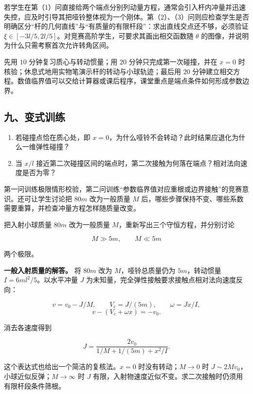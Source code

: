 \documentclass[12pt,a4paper,UTF8]{ctexart}
\newcommand{\tightlist}{\setlength{\itemsep}{0pt}\setlength{\parskip}{0pt}}
\begin{document}
若学生在第（1）问直接给两个端点分别列动量方程，通常会引入杆内冲量并迅速失控，应及时引导其把哑铃整体视为一个刚体。第（2）、（3）问则应检查学生是否明确区分``杆的几何直线''与``有质量的有限杆段''：求出直线交点还不够，必须验证
\(\xi\in[-3l/5,2l/5]\)。对竞赛高阶学生，可要求其画出相交函数随
\(\theta\) 的图像，并说明为什么只需考察首次允许转角区间。

先用 \(10\) 分钟复习质心与转动惯量；用 \(20\) 分钟只完成第一次碰撞，并在
\(x=0\) 时核验；休息式地用实物笔演示杆的转动与小球轨迹；最后用 \(20\)
分钟建立相交方程。数值临界值可以交给计算器或课后程序，课堂重点是端点条件如何形成参数边界。

\subsection{九、变式训练}\label{ux4e5dux53d8ux5f0fux8badux7ec3-1}

\begin{enumerate}
\def\labelenumi{\arabic{enumi}.}
\tightlist
\item
  若碰撞点恰在质心处，即
  \(x=0\)，为什么哑铃不会转动？此时结果应退化为什么一维弹性碰撞？
\item
  当 \(x/l\)
  接近第二次碰撞区间的端点时，第二次接触为何落在端点？相对法向速度是否为零？
\end{enumerate}

第一问训练极限情形校验，第二问训练``参数临界值对应重根或边界接触''的竞赛意识。还可让学生讨论把
\(80m\) 改为一般质量 \(M\)
后，哪些步骤保持不变、哪些系数需要重算，并检查冲量方程怎样随质量改变。

把入射小球质量 \(80m\) 改为一般质量
\(M\)，重新写出三个守恒方程，并分别讨论

\[M\gg5m,\qquad M\ll5m\]

两个极限。

\textbf{一般入射质量的解答。} 将 \(80m\) 改为 \(M\)，哑铃总质量仍为
\(5m\)，转动惯量 \(I=6ml^2/5\)。以水平冲量 \(J\)
为未知量，完全弹性接触要求接触点相对法向速度反向：

\[v=v_0-J/M,\qquad V_c=J/(5m),\qquad \omega=Jx/I,\]
\[v-(V_c+\omega x)=-v_0.\]

消去各速度得到

\[J=\frac{2v_0}{1/M+1/(5m)+x^2/I}.\]

这个表达式也给出一个简洁的复核法。\(x=0\) 时没有转动；\(M\to0\) 时
\(J\sim2Mv_0\)，小球近似反弹；\(M\to\infty\) 时 \(J\)
有限，入射物速度近似不变。求二次接触时仍须用有限杆段条件筛根。

\newpage
\end{document}
